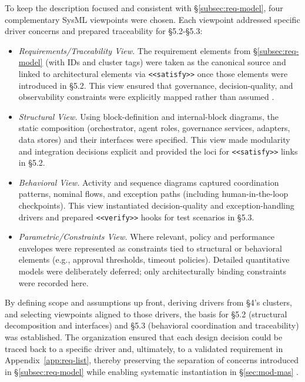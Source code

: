 To keep the description focused and consistent with §\ref{subsec:req-model}, four complementary SysML viewpoints were chosen. Each viewpoint addressed specific driver concerns and prepared traceability for §5.2-§5.3:
\begin{itemize}
\item \emph{Requirements/Traceability View.} The requirement elements from §\ref{subsec:req-model} (with IDs and cluster tags) were taken as the canonical source and linked to architectural elements via \texttt{<<satisfy>>} once those elements were introduced in §5.2. This view ensured that governance, decision-quality, and observability constraints were explicitly mapped rather than assumed \parencite{IEEEStandard1990}.
\item \emph{Structural View.} Using block-definition and internal-block diagrams, the static composition (orchestrator, agent roles, governance services, adapters, data stores) and their interfaces were specified. This view made modularity and integration decisions explicit and provided the loci for \texttt{<<satisfy>>} links in §5.2.
\item \emph{Behavioral View.} Activity and sequence diagrams captured coordination patterns, nominal flows, and exception paths (including human-in-the-loop checkpoints). This view instantiated decision-quality and exception-handling drivers and prepared \texttt{<<verify>>} hooks for test scenarios in §5.3.
\item \emph{Parametric/Constraints View.} Where relevant, policy and performance envelopes were represented as constraints tied to structural or behavioral elements (e.g., approval thresholds, timeout policies). Detailed quantitative models were deliberately deferred; only architecturally binding constraints were recorded here.
\end{itemize}

By defining scope and assumptions up front, deriving drivers from §4's clusters, and selecting viewpoints aligned to those drivers, the basis for §5.2 (structural decomposition and interfaces) and §5.3 (behavioral coordination and traceability) was established. The organization ensured that each design decision could be traced back to a specific driver and, ultimately, to a validated requirement in Appendix~\ref{app:req-list}, thereby preserving the separation of concerns introduced in §\ref{subsec:req-model} while enabling systematic instantiation in §\ref{sec:mod-mas} \parencite{IEEEStandard1990,peffersDesign2007}.

